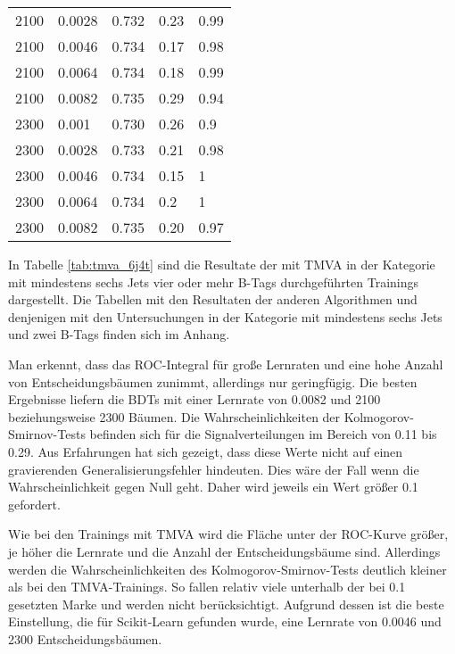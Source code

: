 \begin{table}[tbp]
\begin{center}
\begin{tabular}{lllll}
 \num{2100}  & \num{0,0028}  & \num{0,732} & \num{0,23} & \num{0,99}\\
 \num{2100}  & \num{0,0046}  & \num{0,734} & \num{0,17} & \num{0,98}\\
 \num{2100}  & \num{0,0064}  & \num{0,734} & \num{0,18} & \num{0,99}\\
 \num{2100}  & \num{0,0082}  & \num{0,735} & \num{0,29} & \num{0,94}\\
 \num{2300}  & \num{0,001}   & \num{0,730} & \num{0,26} & \num{0,9}\\
 \num{2300}  & \num{0,0028}  & \num{0,733} & \num{0,21} & \num{0,98}\\
 \num{2300}  & \num{0,0046}  & \num{0,734} & \num{0,15} & \num{1}\\
 \num{2300}  & \num{0,0064}  & \num{0,734} & \num{0,2}  & \num{1}\\
 \num{2300}  & \num{0,0082}  & \num{0,735} & \num{0,20} & \num{0,97}\\
  \hline
  \end{tabular}
  \end{center}
\end{table}

In Tabelle \ref{tab:tmva_6j4t} sind die Resultate der mit TMVA in der Kategorie mit mindestens sechs Jets vier oder mehr B-Tags durchgef\"uhrten Trainings dargestellt. Die Tabellen mit den Resultaten der anderen Algorithmen und denjenigen mit den Untersuchungen in der Kategorie mit mindestens sechs Jets und zwei B-Tags finden sich im Anhang.

Man erkennt, dass das ROC-Integral f\"ur gro\ss e Lernraten und eine hohe Anzahl von Entscheidungsb\"aumen zunimmt, allerdings nur geringf\"ugig. Die besten Ergebnisse liefern die BDTs mit einer Lernrate von \num{0,0082} und 2100 beziehungsweise 2300 B\"aumen. Die Wahrscheinlichkeiten der Kolmogorov-Smirnov-Tests befinden sich f\"ur die Signalverteilungen im Bereich von \num{0,11} bis \num{0,29}. Aus Erfahrungen hat sich gezeigt, dass diese Werte nicht auf einen gravierenden Generalisierungsfehler hindeuten. Dies w\"are der Fall wenn die Wahrscheinlichkeit gegen Null geht. Daher wird jeweils ein Wert gr\"o\ss er \num{0,1} gefordert.

Wie bei den Trainings mit TMVA wird die Fl\"ache unter der ROC-Kurve gr\"o\ss er, je h\"oher die Lernrate und die Anzahl der Entscheidungsb\"aume sind. Allerdings werden die Wahrscheinlichkeiten des Kolmogorov-Smirnov-Tests deutlich kleiner als bei den TMVA-Trainings. So fallen relativ viele unterhalb der bei \num{0,1} gesetzten Marke und werden nicht ber\"ucksichtigt. Aufgrund dessen ist die beste Einstellung, die f\"ur Scikit-Learn gefunden wurde, eine Lernrate von \num{0,0046} und \num{2300} Entscheidungsb\"aumen.

